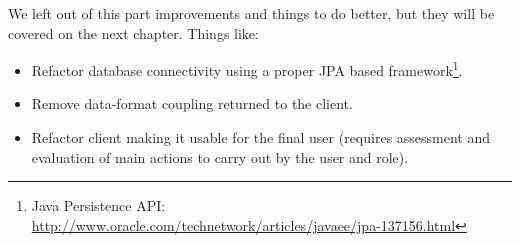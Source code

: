 We left out of this part improvements and things to do better, but they will be
covered on the next chapter. Things like:

\begin{itemize}
	\item Refactor database connectivity using a proper JPA based framework\footnote{Java Persistence API:
	\url{http://www.oracle.com/technetwork/articles/javaee/jpa-137156.html}}.
	\item Remove data-format coupling returned to the client.
	\item Refactor client making it usable for the final user (requires assessment
	and evaluation of main actions to carry out by the user and role).
\end{itemize}

%
